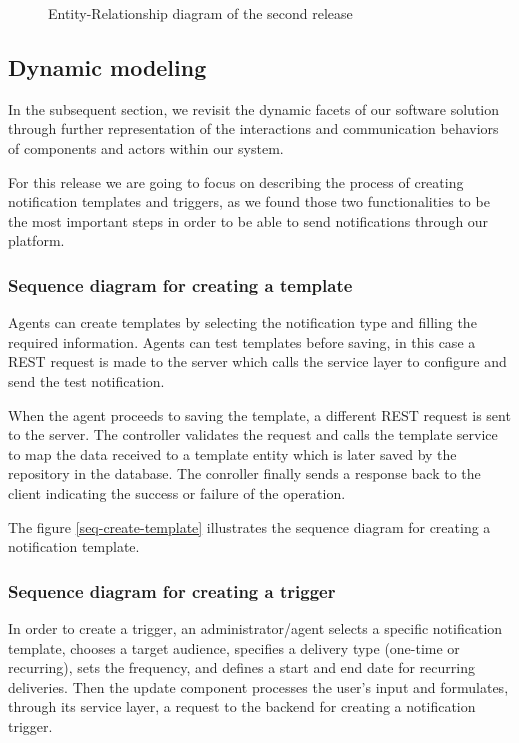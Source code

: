 \begin{landscape}
    \begin{figure}[hbt!]
        \centering
        
        \caption{Entity-Relationship diagram of the second release}
        \label{r2-erd}
    \end{figure}
\end{landscape}


\subsection{Dynamic modeling}
In the subsequent section, we revisit the dynamic facets of our software solution through further
representation of the interactions and communication behaviors of components and actors within our system.

For this release we are going to focus on describing the process of creating notification templates
and triggers, as we found those two functionalities to be the most important steps in
order to be able to send notifications through our platform.

\subsubsection{Sequence diagram for creating a template}
Agents can create templates by selecting the notification type and filling the required information. Agents
can test templates before saving, in this case a REST request is made to the server which calls the service
layer to configure and send the test notification.

When the agent proceeds to saving the template, a different REST request is sent to the server.
The controller validates the request and calls the template service to map the data received to a template
entity which is later saved by the repository in the database. The conroller finally sends a response back
to the client indicating the success or failure of the operation.

\noindent The figure \ref{seq-create-template} illustrates the sequence diagram for creating a notification template.

\subsubsection{Sequence diagram for creating a trigger}
In order to create a trigger, an administrator/agent selects a specific notification template, chooses a target
audience, specifies a delivery type (one-time or recurring), sets the frequency, and defines a start and end
date for recurring deliveries. Then the update component processes the user's input and formulates, through
its service layer, a request to the backend for creating a notification trigger.

